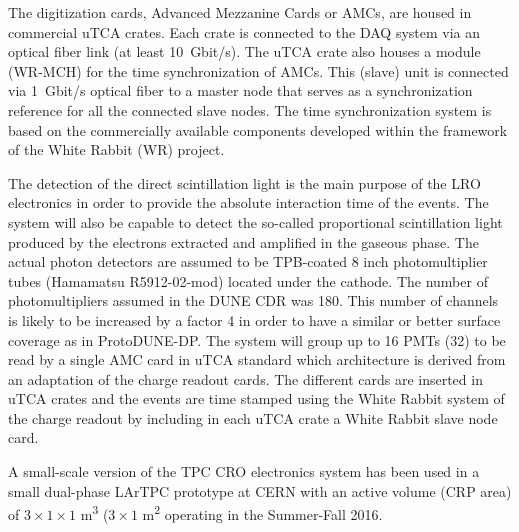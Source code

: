 The digitization cards, Advanced Mezzanine Cards or AMCs, are housed in commercial uTCA crates. Each crate is connected to the DAQ system via an optical fiber link (at least \SI{10}{Gbit/s}). The uTCA crate also houses a module (WR-MCH) for the time synchronization of AMCs. This (slave) unit is connected via \SI{1}{Gbit/s} optical fiber to a master node that serves as a synchronization reference for all the connected slave nodes.  The time synchronization system is based on the commercially available components developed within the framework of the White Rabbit (WR) project. 

The detection of the direct scintillation light is the main purpose of the LRO electronics in order to provide the absolute interaction time of the events.
 The system will also be capable to detect the so-called proportional scintillation light produced by the electrons extracted and amplified in the gaseous phase. The actual photon detectors are assumed to be TPB-coated \num{8} inch photomultiplier tubes (Hamamatsu R5912-02-mod) located under the cathode. The number of photomultipliers assumed in the DUNE CDR was 180. This number of channels is likely to be increased by a factor 4 in order to have a similar or better surface coverage as in ProtoDUNE-DP. %
The system will group up to 16 PMTs (32) to be read by a single AMC card in uTCA standard which architecture is derived from an adaptation of the charge readout cards. The different cards are inserted in uTCA crates and the events are time stamped using the White Rabbit system of the charge readout by including in each uTCA crate a White Rabbit slave node card.

A small-scale version of the TPC CRO electronics system has been used in a small dual-phase LArTPC prototype at CERN with an active volume (CRP area) of $3\times 1 \times 1$ \si{\meter\cubed} ($3\times1$ \si{\meter\squared} operating in the Summer-Fall 2016. 


